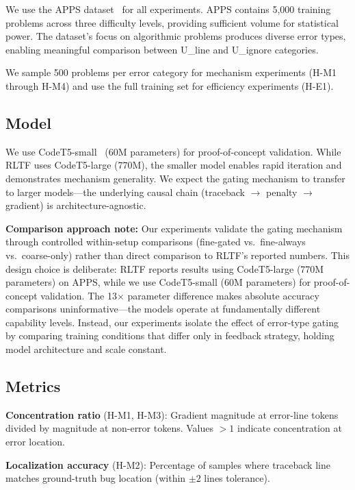 We use the APPS dataset~\cite{hendrycks2021apps} for all experiments. APPS contains 5,000 training problems across three difficulty levels, providing sufficient volume for statistical power. The dataset's focus on algorithmic problems produces diverse error types, enabling meaningful comparison between U\_line and U\_ignore categories.

We sample 500 problems per error category for mechanism experiments (H-M1 through H-M4) and use the full training set for efficiency experiments (H-E1).

\subsection{Model}

We use CodeT5-small~\cite{wang2021codet5} (60M parameters) for proof-of-concept validation. While RLTF uses CodeT5-large (770M), the smaller model enables rapid iteration and demonstrates mechanism generality. We expect the gating mechanism to transfer to larger models---the underlying causal chain (traceback $\rightarrow$ penalty $\rightarrow$ gradient) is architecture-agnostic.

\textbf{Comparison approach note:} Our experiments validate the gating mechanism through controlled within-setup comparisons (fine-gated vs.\ fine-always vs.\ coarse-only) rather than direct comparison to RLTF's reported numbers. This design choice is deliberate: RLTF reports results using CodeT5-large (770M parameters) on APPS, while we use CodeT5-small (60M parameters) for proof-of-concept validation. The 13$\times$ parameter difference makes absolute accuracy comparisons uninformative---the models operate at fundamentally different capability levels. Instead, our experiments isolate the effect of error-type gating by comparing training conditions that differ only in feedback strategy, holding model architecture and scale constant.

\subsection{Metrics}

\textbf{Concentration ratio} (H-M1, H-M3): Gradient magnitude at error-line tokens divided by magnitude at non-error tokens. Values $>1$ indicate concentration at error location.

\textbf{Localization accuracy} (H-M2): Percentage of samples where traceback line matches ground-truth bug location (within $\pm 2$ lines tolerance).

